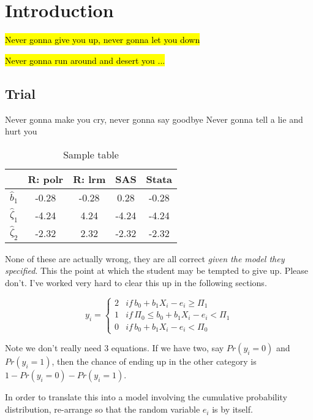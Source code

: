 
\chapter{Introduction}

\hl{Never gonna give you up, never gonna let you down}

\hl{Never gonna run around and desert you ...} 




\section{Trial}

Never gonna make you cry, never gonna say goodbye
Never gonna tell a lie and hurt you


\begin{table}


\caption{Sample table\label{tab:Ordinal-Regression-Results}}


\centering{}%
\begin{tabular}{|c|c|c|c|c|}
\hline 
 & R: polr & R: lrm & SAS & Stata\tabularnewline
\hline 
\hline 
$\hat{b}_{1}$ & -0.28 & -0.28 & 0.28 & -0.28\tabularnewline
\hline 
$\hat{\zeta}_{1}$ & -4.24 & 4.24 & -4.24 & -4.24\tabularnewline
\hline 
$\hat{\zeta}_{2}$ & -2.32 & 2.32 & -2.32 & -2.32\tabularnewline
\hline 
\end{tabular}
\end{table}


\noindent None of these are actually wrong, they are all correct \emph{given
the model they specified}. This the point at which the student may
be tempted to give up. Please don't. I've worked very hard to clear
this up in the following sections.



\begin{equation}
y_{i}=\left\{ \begin{array}{lll}
2 & if\, b_{0}+b_{1}X_{i}-e_{i}\geq\Pi_{1}\\
1 & if\,\Pi_{0}\leq b_{0}+b_{1}X_{i}-e_{i}<\Pi_{1}\\
0 & if\, b_{0}+b_{1}X_{i}-e_{i}<\Pi_{0}
\end{array}\right.\label{eq:3category1}
\end{equation}


Note we don't really need 3 equations. If we have two, say $Pr(y_{i}=0)$
and $Pr(y_{i}=1)$, then the chance of ending up in the other category
is $1-Pr(y_{i}=0)-Pr(y_{i}=1)$.

In order to translate this into a model involving the cumulative probability
distribution, re-arrange so that the random variable $e_{i}$ is by
itself.

